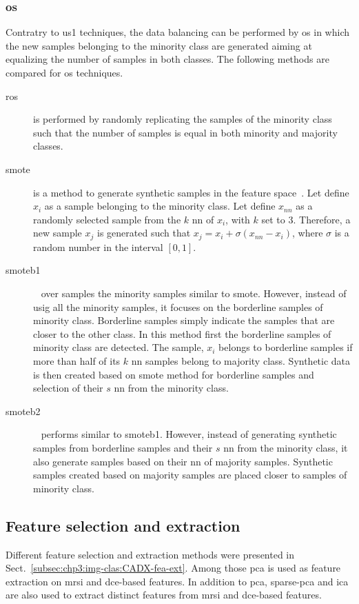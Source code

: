 \subsubsection{\Acl*{os}}
Contratry to \ac{us1} techniques, the data balancing can be performed by \ac{os} in which the new samples belonging to the minority class are generated aiming at equalizing the number of samples in both classes.
The following methods are compared for \ac{os} techniques.
\begin{description}
\item[\Ac{ros}] is performed by randomly replicating the samples of the minority class such that the number of samples is equal in both minority and majority classes.
\item[\Ac{smote}] is a method to generate synthetic samples in the feature space~\cite{chawla2002smote}.
Let define $x_i$ as a sample belonging to the minority class.
Let define $x_{nn}$ as a randomly selected sample from the $k$ \ac{nn} of $x_i$, with $k$ set to 3.
Therefore, a new sample $x_j$ is generated such that $x_j = x_i + \sigma \left( x_{nn} - x_i \right)$, where $\sigma$ is a random number in the interval $\left[0,1\right]$.
\item[\Ac{smoteb1}]~\cite{han2005borderline} over samples the minority samples similar to \ac{smote}.
However, instead of usig all the minority samples, it focuses on the borderline samples of minority class.
Borderline samples simply indicate the samples that are closer to the other class.
In this method first the borderline samples of minority class are detected.
The sample, $x_{i}$ belongs to borderline samples if more than half of its $k$ \ac{nn} samples belong to majority class.
Synthetic data is then created based on \ac{smote} method for borderline samples and selection of their $s$ \ac{nn} from the minority class.
 
\item[\Ac{smoteb2}]~\cite{han2005borderline} performs similar to \ac{smoteb1}.
However, instead of generating synthetic samples from borderline samples and their $s$ \ac{nn} from the minority class, it also generate samples based on their \ac{nn} of majority samples.
Synthetic samples created based on majority samples are placed closer to samples of minority class.
\end{description}

\subsection{Feature selection and extraction}\label{subsec:chp6:method:fea-sel}
Different feature selection and extraction methods were presented in Sect.~\ref{subsec:chp3:img-clas:CADX-fea-ext}.
Among those \ac{pca} is used as feature extraction on  \ac{mrsi} and \ac{dce}-based features.
In addition to \ac{pca}, sparse-\ac{pca} and \ac{ica} are also used to extract distinct features from \ac{mrsi} and \ac{dce}-based features.

